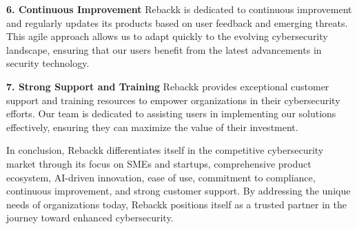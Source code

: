 \textbf{6. Continuous Improvement}  
Rebackk is dedicated to continuous improvement and regularly updates its products based on user feedback and emerging threats. This agile approach allows us to adapt quickly to the evolving cybersecurity landscape, ensuring that our users benefit from the latest advancements in security technology.

\textbf{7. Strong Support and Training}  
Rebackk provides exceptional customer support and training resources to empower organizations in their cybersecurity efforts. Our team is dedicated to assisting users in implementing our solutions effectively, ensuring they can maximize the value of their investment.

In conclusion, Rebackk differentiates itself in the competitive cybersecurity market through its focus on SMEs and startups, comprehensive product ecosystem, AI-driven innovation, ease of use, commitment to compliance, continuous improvement, and strong customer support. By addressing the unique needs of organizations today, Rebackk positions itself as a trusted partner in the journey toward enhanced cybersecurity.